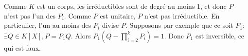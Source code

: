 {\begin{enumerate}
{     Comme $K$ est un corps, les irréductibles sont de degré au moins
     $1$, et donc $P$ n'est pas l'un des $P_i$. Comme $P$ est unitaire,
     $P$ n'est pas irréductible. En particulier, l'un au moins des $P_i$
     divise $P$. Supposons par exemple que ce soit $P_1$: $\exists Q\in
     K[X], P=P_1Q$. Alors $P_1(Q-\prod_{i=2}^k P_i)=1$. Donc $P_1$ est
     inversible, ce qui est faux.}
\end{enumerate}
}

